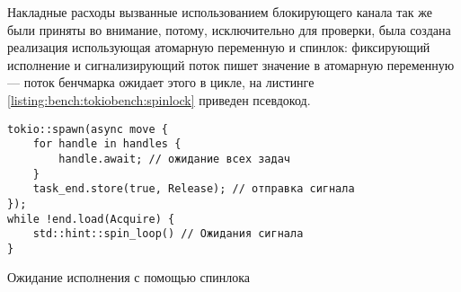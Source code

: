 Накладные расходы вызванные использованием блокирующего канала так же были приняты во внимание, потому, исключительно для проверки, была создана реализация использующая атомарную переменную и спинлок: фиксирующий исполнение и сигнализирующий поток пишет значение в атомарную переменную --- поток бенчмарка ожидает этого в цикле, на листинге \ref{listing:bench:tokiobench:spinlock} приведен псевдокод.

\begin{listing}[H]
    \begin{verbatim}
tokio::spawn(async move {
    for handle in handles {
        handle.await; // ожидание всех задач
    }
    task_end.store(true, Release); // отправка сигнала
});
while !end.load(Acquire) {
    std::hint::spin_loop() // Ожидания сигнала
}
    \end{verbatim}
    \caption{Ожидание исполнения с помощью спинлока}
    \label{listing:bench:tokiobench:spinlock}
\end{listing}
